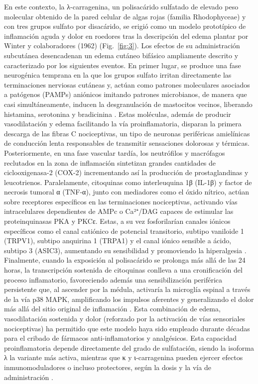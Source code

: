 \documentclass[10pt,a4paper]{article}
\begin{document}
En este contexto, la λ-carragenina, un polisacárido sulfatado de elevado peso molecular obtenido de la pared celular de algas rojas (familia Rhodophyceae) y con tres grupos sulfato por disacárido, se erigió como un modelo prototípico de inflamación aguda y dolor en roedores tras la descripción del edema plantar por Winter y colaboradores (1962) \parencite{Winter1962} (Fig.~\ref{fig:3}). Los efectos de su administración subcutánea desencadenan un edema cutáneo bifásico ampliamente descrito y caracterizado por los siguientes eventos. En primer lugar, se produce una fase neurogénica temprana en la que los grupos sulfato irritan directamente las terminaciones nerviosas cutáneas y, actúan como patrones moleculares asociados a patógenos (PAMPs) aniónicos imitando patrones microbianos, de manera que casi simultáneamente, inducen la desgranulación de mastocitos vecinos, liberando histamina, serotonina y bradicinina \parencite{Patil2017}. Estas moléculas, además de producir vasodilatación y edema facilitando la vía proinflamatoria, disparan la primera descarga de las fibras C nociceptivas, un tipo de neuronas periféricas amielínicas de conducción lenta responsables de transmitir sensaciones dolorosas y térmicas. Posteriormente, en una fase vascular tardía, los neutrófilos y macrófagos reclutados en la zona de inflamación sintetizan grandes cantidades de ciclooxigenasa-2 (COX-2) incrementando así la producción de prostaglandinas y leucotrienos. Paralelamente, citoquinas como interleuquina 1β (IL-1β) y factor de necrosis tumoral α (TNF-α), junto con mediadores como el óxido nítrico, actúan sobre receptores específicos en las terminaciones nociceptivas, activando vías intracelulares dependientes de AMPc o Ca²⁺/DAG capaces de estimular las proteinquinasas PKA y PKCε. Estas, a su vez fosforilarían canales iónicos específicos como el canal catiónico de potencial transitorio, subtipo vaniloide 1 (TRPV1), subtipo anquirina 1 (TRPA1) y el canal iónico sensible a ácido, subtipo 3 (ASIC3), aumentando su sensibilidad y promoviendo la hiperalgesia \parencite{Gouin2017,Roh2020}. Finalmente, cuando la exposición al polisacárido se prolonga más allá de las 24 horas, la transcripción sostenida de citoquinas conlleva a una cronificación del proceso inflamatorio, favoreciendo además una sensibilización periférica persistente que, al ascender por la médula, activaría la microglía espinal a través de la vía p38 MAPK, amplificando los impulsos aferentes y generalizando el dolor más allá del sitio original de inflamación \parencite{Ji2007}. Esta combinación de edema, vasodilatación sostenida y dolor (reforzado por la activación de vías sensoriales nociceptivas) ha permitido que este modelo haya sido empleado durante décadas para el cribado de fármacos anti-inflamatorios y analgésicos. Esta capacidad proinflamatoria depende directamente del grado de sulfatación, siendo la isoforma λ la variante más activa, mientras que κ y ι-carragenina pueden ejercer efectos inmunomoduladores o incluso protectores, según la dosis y la vía de administración \parencite{Cheng2008,Cheng2007}. 
\end{document}

